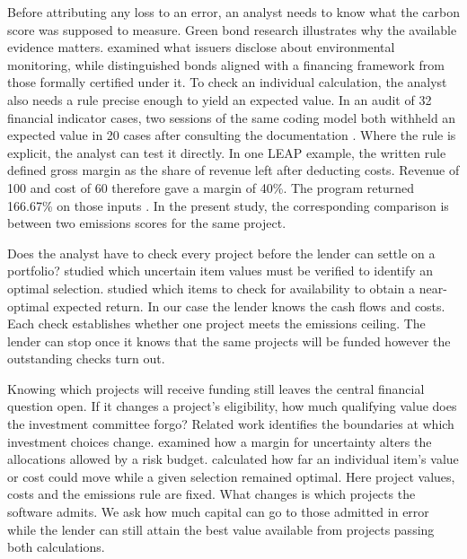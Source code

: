 \documentclass[ijfs,article,submit,oneauthor]{Definitions/mdpi}
\begin{document}
Before attributing any loss to an error, an analyst needs to know what the carbon score was supposed to measure. Green bond research illustrates why the available evidence matters. \citet{nicolici} examined what issuers disclose about environmental monitoring, while \citet{loiola} distinguished bonds aligned with a financing framework from those formally certified under it. To check an individual calculation, the analyst also needs a rule precise enough to yield an expected value. In an audit of 32 financial indicator cases, two sessions of the same coding model both withheld an expected value in 20 cases after consulting the documentation \citep{reconstruction}. Where the rule is explicit, the analyst can test it directly. In one LEAP example, the written rule defined gross margin as the share of revenue left after deducting costs. Revenue of 100 and cost of 60 therefore gave a margin of 40\%. The program returned 166.67\% on those inputs \citep{review}. In the present study, the corresponding comparison is between two emissions scores for the same project.

Does the analyst have to check every project before the lender can settle on a portfolio? \citet{schloter} studied which uncertain item values must be verified to identify an optimal selection. \citet{dughmi} studied which items to check for availability to obtain a near-optimal expected return. In our case the lender knows the cash flows and costs. Each check establishes whether one project meets the emissions ceiling. The lender can stop once it knows that the same projects will be funded however the outstanding checks turn out.

Knowing which projects will receive funding still leaves the central financial question open. If it changes a project's eligibility, how much qualifying value does the investment committee forgo? Related work identifies the boundaries at which investment choices change. \citet{hien} examined how a margin for uncertainty alters the allocations allowed by a risk budget. \citet{pisinger} calculated how far an individual item's value or cost could move while a given selection remained optimal. Here project values, costs and the emissions rule are fixed. What changes is which projects the software admits. We ask how much capital can go to those admitted in error while the lender can still attain the best value available from projects passing both calculations.
\end{document}
